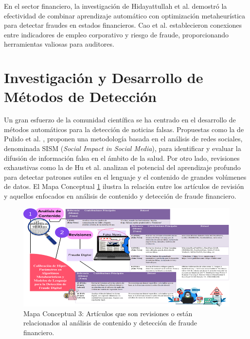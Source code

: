 En el sector financiero, la investigación de Hidayattullah et al. \cite{hidayattullah2020financial} demostró la efectividad de combinar aprendizaje automático con optimización metaheurística para detectar fraudes en estados financieros. Cao et al. \cite{cao2020corporate} establecieron conexiones entre indicadores de empleo corporativo y riesgo de fraude, proporcionando herramientas valiosas para auditores.

\section{Investigación y Desarrollo de Métodos de Detección}

Un gran esfuerzo de la comunidad científica se ha centrado en el desarrollo de métodos automáticos para la detección de noticias falsas. Propuestas como la de Pulido et al. \cite{pulido2020new}, proponen una metodología basada en el análisis de redes sociales, denominada SISM (\textit{Social Impact in Social Media}), para identificar y evaluar la difusión de información falsa en el ámbito de la salud. Por otro lado, revisiones exhaustivas como la de Hu et al. \cite{hu2022deep} analizan el potencial del aprendizaje profundo para detectar patrones sutiles en el lenguaje y el contenido de grandes volúmenes de datos. El Mapa Conceptual \ref{fig:mapa_conceptual_3} ilustra la relación entre los artículos de revisión y aquellos enfocados en análisis de contenido y detección de fraude financiero.

\begin{figure}[h!]
    \centering
    \includegraphics[width=\textwidth]{Imagenes/mapaConceptual3.png}
    \caption{Mapa Conceptual 3: Artículos que son revisiones o están relacionados al análisis de contenido y detección de fraude financiero.}
    \label{fig:mapa_conceptual_3}
\end{figure}

